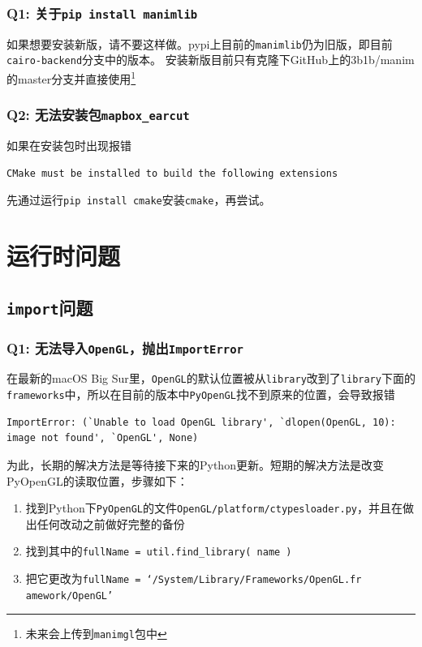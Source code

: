 \documentclass[cn,blue,14pt,normal]{elegantnote}
\begin{document}
\subsubsection*{Q1: 关于\texttt{pip install manimlib}}
如果想要安装新版，请不要这样做。pypi上目前的\texttt{manimlib}仍为旧版，即目前\texttt{cairo-backend}分支中的版本。
安装新版目前只有克隆下GitHub上的3b1b/manim的master分支并直接使用\footnote{未来会上传到\texttt{manimgl}包中}

\subsubsection*{Q2: 无法安装包\texttt{mapbox\_earcut}}
如果在安装包时出现报错
\begin{lstlisting}[frame=none, columns=flexible]
CMake must be installed to build the following extensions
\end{lstlisting}

先通过运行\texttt{pip install cmake}安装\texttt{cmake}，再尝试。

\newpage

\section{运行时问题}

\subsection{\texttt{import}问题}

\subsubsection*{Q1: 无法导入\texttt{OpenGL}，抛出\texttt{ImportError}}
在最新的macOS Big Sur里，\texttt{OpenGL}的默认位置被从\texttt{library}改到了\texttt{library}下面的
\texttt{frameworks}中，所以在目前的版本中\texttt{PyOpenGL}找不到原来的位置，会导致报错
\begin{lstlisting}[frame=none, columns=flexible]
ImportError: (`Unable to load OpenGL library', `dlopen(OpenGL, 10): image not found', `OpenGL', None)
\end{lstlisting}

为此，长期的解决方法是等待接下来的Python更新。短期的解决方法是改变PyOpenGL的读取位置，步骤如下：
\begin{enumerate}[1.]
	\item 找到Python下\texttt{PyOpenGL}的文件\texttt{OpenGL/platform/ctypesloader.py}，并且在做出任何改动之前做好完整的备份
	\item 找到其中的\texttt{fullName = util.find\_library( name )}
	\item 把它更改为\texttt{fullName = `/System/Library/Frameworks/OpenGL.fr}\\\texttt{amework/OpenGL'}
\end{enumerate}
\end{document}
